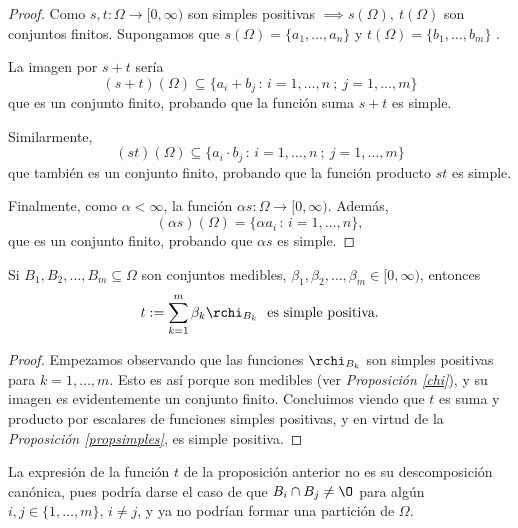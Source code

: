   \begin{proof}
    Como $s,t: \Omega \longrightarrow [0,\infty)$ son simples positivas $\implies s(\Omega) , \ t(\Omega)$ son conjuntos finitos. Supongamos que $s(\Omega) =\{ a_1, \dots ,a_n\}$  y $t(\Omega) = \{ b_1, \dots ,b_m\}$ .

    La imagen por $s+ t$ sería
    $$(s+t)(\Omega) \subseteq \{ a_i + b_j \, :\, i=1,\dots ,n \ ; \ j=1,\dots ,m\}$$
    que es un conjunto finito, probando que la función suma $s+t$ es simple.

    Similarmente, $$(st)(\Omega ) \subseteq \{ a_i \cdot b_j \, : \, i=1,\dots ,n \ ; \ j=1,\dots ,m \}$$
    que también es un conjunto finito, probando que la función producto $st$ es simple.

    Finalmente, como $\alpha< \infty$, la función $\alpha s:\Omega \longrightarrow [0,\infty)$. Además,
    $$(\alpha s)(\Omega) = \{ \alpha a_i \,:\, i=1,\dots ,n \},$$
    que es un  conjunto finito, probando que $\alpha s$ es simple.
  \end{proof}

\begin{nprop} \label{caract_simples}
Si $B_1, B_2,\dots ,B_m \subseteq \Omega$ son conjuntos medibles,
$\beta_1,\beta_2,\dots,\beta_m \in[0,\infty)$, entonces $$t:= \sum_{k=1}^{m}  \beta_k \rchi_{B_k} \ \ \text{es simple positiva.}$$
\end{nprop}

\begin{proof}
	Empezamos observando que las funciones $\rchi_{B_k}$ son simples positivas para $k=1,\dots,m$. Esto es así porque son medibles (ver \textit{Proposición \ref{chi}}), y su imagen es evidentemente un conjunto finito. Concluimos viendo que $t$ es suma y producto por escalares de funciones simples positivas, y en virtud de la \textit{Proposición \ref{propsimples}}, es simple positiva.
\end{proof}

\begin{nota}
	La expresión de la función $t$ de la proposición anterior no es su descomposición canónica, pues podría darse el caso de que $B_i \cap B_j \neq \O$ para algún $i,j \in \{1,\dots,m\}$, $i\neq j$, y ya no podrían formar una partición de $\Omega$.
\end{nota}


